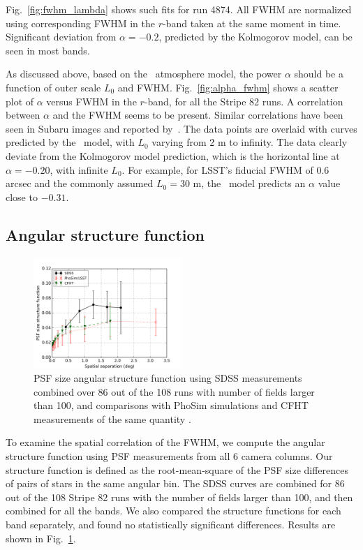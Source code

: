Fig.~\ref{fig:fwhm_lambda} shows such fits for run 4874. All FWHM are normalized using 
corresponding FWHM in the $r$-band taken at the same moment in time. Significant deviation 
from $\alpha = -0.2$, predicted by the Kolmogorov model, can be seen in most bands.


As discussed above, based on the \vk~atmosphere model, the
power $\alpha$ should be a function of outer scale $L_0$ and 
FWHM. 
Fig.~\ref{fig:alpha_fwhm} shows a scatter plot of $\alpha$ versus FWHM
in the $r$-band, for all the Stripe 82 runs.
A correlation between $\alpha$ and the FWHM seems to be present.
Similar correlations have been seen in Subaru images and reported by~\cite{subaruSeeing2016}.
The data points are overlaid with curves predicted by the 
\vk~model, with $L_0$ varying from 2 m to infinity.
The data clearly deviate from the Kolmogorov model prediction, which is
the horizontal line at $\alpha = -0.20$, with infinite $L_0$.
For example, for LSST's fiducial FWHM of 0.6 arcsec and the commonly assumed 
$L_0 = 30$ m, the \vk~model predicts an $\alpha$ value close to $-0.31$.



\subsection{Angular structure function} 

\begin{figure}
\centering
\includegraphics[width=0.5\textwidth]{FIGURES/spatial.png}
\caption{PSF size angular structure function using SDSS measurements
  combined over 86 out of the 108 runs with number of fields larger
  than 100, and comparisons with PhoSim simulations and CFHT
  measurements of the same quantity \citep{heymans2012}.
\label{fig:spatial}}
\end{figure}

To examine the spatial correlation of the FWHM, we compute the angular
structure function using PSF measurements from all 6 camera columns.
Our structure function is defined as
the root-mean-square of the PSF size differences of pairs of stars
in the same angular bin. 
The SDSS curves are combined for 86 out of the 108 Stripe 82 runs with the number of
fields larger than 100, and then combined for all
the bands. We also compared the structure functions for each band
separately, and found no statistically significant differences.
Results are shown in Fig.~\ref{fig:spatial}.

